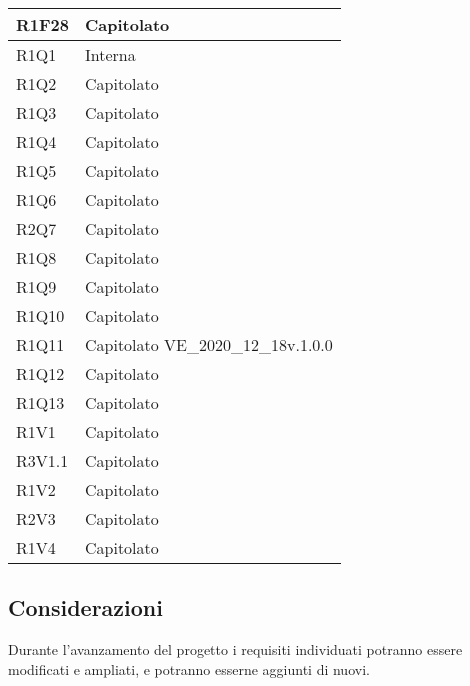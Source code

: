\begin{center}
\begin{longtable}{|p{22mm}|p{44mm}|}
R1F28 &
Capitolato \newline
\\
\hline

R1Q1 &
Interna \newline
\\
\hline

R1Q2 &
Capitolato \newline
\\
\hline

R1Q3 &
Capitolato \newline
\\
\hline

R1Q4 &
Capitolato \newline
\\
\hline

R1Q5 &
Capitolato \newline
\\
\hline

R1Q6 &
Capitolato \newline
\\
\hline

R2Q7 &
Capitolato \newline
\\
\hline

R1Q8 &
Capitolato \newline
\\
\hline

R1Q9 &
Capitolato \newline
\\
\hline

R1Q10 &
Capitolato \newline
\\
\hline

R1Q11 &
Capitolato \newline
VE\_2020\_12\_18v.1.0.0 \newline
\\
\hline

R1Q12 &
Capitolato \newline
\\
\hline

R1Q13 &
Capitolato \newline
\\
\hline

R1V1 &
Capitolato \newline
\\
\hline

R3V1.1 &
Capitolato \newline
\\
\hline

R1V2 &
Capitolato \newline
\\
\hline

R2V3 &
Capitolato \newline
\\
\hline

R1V4 &
Capitolato \newline
\\
\hline
	
	\end{longtable}
\end{center}

\subsection{Considerazioni}
Durante l'avanzamento del progetto i requisiti individuati potranno essere modificati e ampliati, e potranno esserne aggiunti di nuovi.